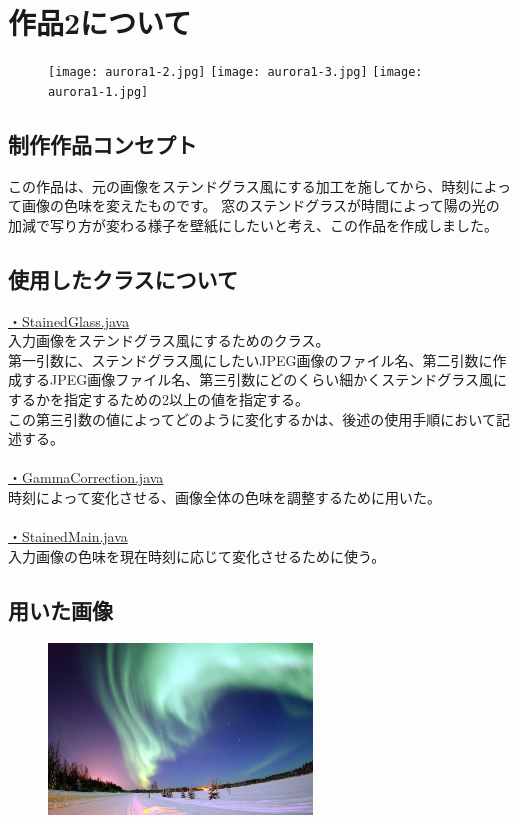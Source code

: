 \documentclass{jsarticle}
\begin{document}
\section{作品2について}
\begin{figure}[htbp]
\begin{center}
\texttt{[image: aurora1-2.jpg]}  
\texttt{[image: aurora1-3.jpg]}  
\texttt{[image: aurora1-1.jpg]}  
\end{center}
\end{figure}
\subsection{制作作品コンセプト}
この作品は、元の画像をステンドグラス風にする加工を施してから、時刻によって画像の色味を変えたものです。
窓のステンドグラスが時間によって陽の光の加減で写り方が変わる様子を壁紙にしたいと考え、この作品を作成しました。
\subsection{使用したクラスについて}
\underline{・StainedGlass.java}\\
入力画像をステンドグラス風にするためのクラス。\\
第一引数に、ステンドグラス風にしたいJPEG画像のファイル名、第二引数に作成するJPEG画像ファイル名、第三引数にどのくらい細かくステンドグラス風にするかを指定するための2以上の値を指定する。\\
この第三引数の値によってどのように変化するかは、後述の使用手順において記述する。\\
\\
\underline{・GammaCorrection.java}\\
時刻によって変化させる、画像全体の色味を調整するために用いた。\\
\\
\underline{・StainedMain.java}\\
入力画像の色味を現在時刻に応じて変化させるために使う。
\newpage
\subsection{用いた画像}
\begin{figure}[htbp]
\begin{center}
\includegraphics[width=70mm]{aurora1.jpg}  
\end{center}
\end{figure}
\end{document}
